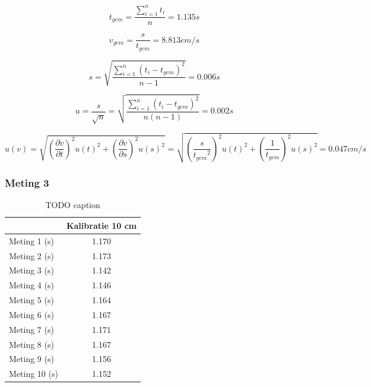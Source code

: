 \documentclass{report}
\begin{document}
$$ t_{gem}=\frac{\sum_{i=1}^{n}t_i}{n} = 1.135 s$$

$$ v_{gem} = \frac{s}{t_{gem}} = 8.813 cm/s$$

$$ s = \sqrt{\frac{\sum_{i=1}^{n}( t_i-t_{gem})^2}{n-1}} = 0.006 s$$

$$ u = \frac{s}{\sqrt{n}} = \sqrt{\frac{\sum_{i=1}^{n}( t_i-t_{gem})^2}{n(n-1)}} = 0.002 s$$

$$ u(v) = \sqrt{\left (\frac{\partial v }{\partial t }\right)^2 u(t)^2 + \left (\frac{\partial v }{\partial s }\right)^2 u(s)^2} = \sqrt{\left (\frac{s }{{t_{gem}}^2 }\right)^2 u(t)^2 + \left (\frac{1}{t_{gem} }\right)^2 u(s)^2} = 0.047 cm/s$$

\subsubsection*{Meting 3}
\begin{table}
\begin{center}
\begin{tabular}{| l| c|}
\hline
    & Kalibratie 10 cm \\
\hline
   Meting 1 (s) & 1.170 \\
\hline
   Meting 2 (s) & 1.173 \\
\hline
   Meting 3 (s) & 1.142 \\
\hline
   Meting 4 (s) & 1.146 \\
\hline
   Meting 5 (s) & 1.164 \\
\hline
   Meting 6 (s) & 1.167 \\
\hline
   Meting 7 (s) & 1.171 \\
\hline
   Meting 8 (s) & 1.167\\
\hline
   Meting 9 (s) & 1.156\\
\hline
   Meting 10 (s) & 1.152\\
\hline
\end{tabular}
\caption{TODO caption}
\end{center}
\end{table}
\end{document}
